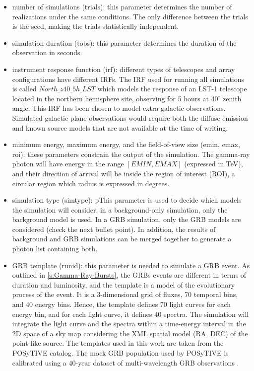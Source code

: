 \begin{itemize}
    \item number of simulations (trials): this parameter determines the number of realizations under the same conditions. The only difference between the trials is the seed, making the trials statistically independent.
    \item simulation duration (tobs): this parameter determines the duration of the observation in seconds.
    \item instrument response function (irf): different types of telescopes and array configurations have different IRFs. The IRF used for running all simulations is called $North\_z40\_5h\_LST$ which models the response of an LST-1 telescope located in the northern hemisphere site, observing for 5 hours at $40^{\circ}$ zenith angle. This IRF has been chosen to model extra-galactic observations. Simulated galactic plane observations would require both the diffuse emission and known source models that are not available at the time of writing.
    \item minimum energy, maximum energy, and the field-of-view size (emin, emax, roi): these parameters constrain the output of the simulation. The gamma-ray photon will have energy in the range $[EMIN, EMAX]$ (expressed in TeV), and their direction of arrival will be inside the region of interest (ROI), a circular region which radius is expressed in degrees.
    \item simulation type (simtype): pThis parameter is used to decide which models the simulation will consider: in a background-only simulation, only the background model is used. In a GRB simulation, only the GRB models are considered (check the next bullet point). In addition, the results of background and GRB simulations can be merged together to generate a photon list containing both.  
    \item GRB template (runid): this parameter is needed to simulate a GRB event. As outlined in \autoref{s:Gamma-Ray-Bursts}, the GRBs events are different in terms of duration and luminosity, and the template is a model of the evolutionary process of the event. It is a 3-dimensional grid of fluxes, 70 temporal bins, and 40 energy bins. Hence, the template defines 70 light curves for each energy bin, and for each light curve, it defines 40 spectra. The simulation will integrate the light curve and the spectra within a time-energy interval in the 2D space of a sky map considering the XML spatial model (RA, DEC) of the point-like source. The templates used in this work are taken from the POSyTIVE catalog. The mock GRB population used by POSyTIVE is calibrated using a 40-year dataset of multi-wavelength GRB observations \cite{Bernardini_2019}.

\end{itemize}
